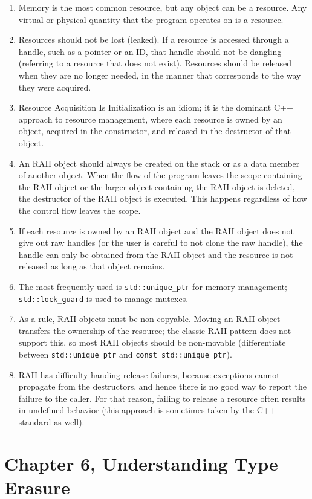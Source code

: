 \begin{enumerate}
\item
  Memory is the most common resource, but any object can be a resource. Any virtual or physical quantity that the program operates on is a resource.
\item
  Resources should not be lost (leaked). If a resource is accessed through a handle, such as a pointer or an ID, that handle should not be dangling (referring to a resource that does not exist). Resources should be released when they are no longer needed, in the manner that corresponds to the way they were acquired.
\item
  Resource Acquisition Is Initialization is an idiom; it is the dominant C++ approach to resource management, where each resource is owned by an object, acquired in the constructor, and released in the destructor of that object.
\item
  An RAII object should always be created on the stack or as a data member of another object. When the flow of the program leaves the scope containing the RAII object or the larger object containing the RAII object is deleted, the destructor of the RAII object is executed. This happens regardless of how the control flow leaves the scope.
\item
  If each resource is owned by an RAII object and the RAII object does not give out raw handles (or the user is careful to not clone the raw handle), the handle can only be obtained from the RAII object and the resource is not released as long as that object remains.
\item
  The most frequently used is \texttt{std::unique\_ptr} for memory management; \texttt{std::lock\_guard} is used to manage mutexes.
\item
  As a rule, RAII objects must be non-copyable. Moving an RAII object transfers the ownership of the resource; the classic RAII pattern does not support this, so most RAII objects should be non-movable (differentiate between \texttt{std::unique\_ptr} and \texttt{const\ std::unique\_ptr}).
\item
  RAII has difficulty handing release failures, because exceptions cannot propagate from the destructors, and hence there is no good way to report the failure to the caller. For that reason, failing to release a resource often results in undefined behavior (this approach is sometimes taken by the C++ standard as well).
\end{enumerate}

\section{Chapter 6, Understanding Type Erasure}


